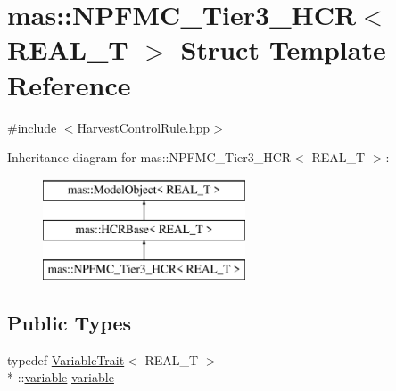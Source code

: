 \hypertarget{structmas_1_1_n_p_f_m_c___tier3___h_c_r}{\section{mas\-:\-:N\-P\-F\-M\-C\-\_\-\-Tier3\-\_\-\-H\-C\-R$<$ R\-E\-A\-L\-\_\-\-T $>$ Struct Template Reference}
\label{structmas_1_1_n_p_f_m_c___tier3___h_c_r}
}


{\ttfamily \#include $<$Harvest\-Control\-Rule.\-hpp$>$}

Inheritance diagram for mas\-:\-:N\-P\-F\-M\-C\-\_\-\-Tier3\-\_\-\-H\-C\-R$<$ R\-E\-A\-L\-\_\-\-T $>$\-:\begin{figure}[H]
\begin{center}
\leavevmode
\includegraphics[height=3.000000cm]{structmas_1_1_n_p_f_m_c___tier3___h_c_r}
\end{center}
\end{figure}
\subsection*{Public Types}
\begin{DoxyCompactItemize}
\item 
typedef \hyperlink{structmas_1_1_variable_trait}{Variable\-Trait}$<$ R\-E\-A\-L\-\_\-\-T $>$\\*
\-::\hyperlink{structmas_1_1_n_p_f_m_c___tier3___h_c_r_a255d04535c769276bb11c0a7e003d775}{variable} \hyperlink{structmas_1_1_n_p_f_m_c___tier3___h_c_r_a255d04535c769276bb11c0a7e003d775}{variable}
\end{DoxyCompactItemize}

